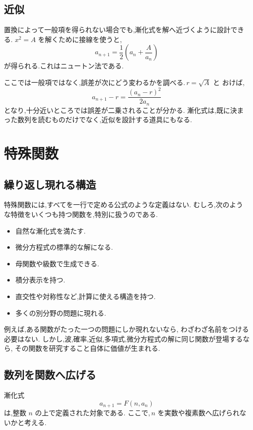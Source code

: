 \subsection{近似}

置換によって一般項を得られない場合でも,漸化式を解へ近づくように設計できる.
$x^2=A$ を解くために接線を使うと,
\[
  a_{n+1}=\frac12\left(a_n+\frac{A}{a_n}\right)
  \tag{A.3}
\]
が得られる.これはニュートン法である.

ここでは一般項ではなく,誤差が次にどう変わるかを調べる.\,$r=\sqrt A$ と
おけば,
\[
  a_{n+1}-r=\frac{(a_n-r)^2}{2a_n}
\]
となり,十分近いところでは誤差が二乗されることが分かる.
漸化式は,既に決まった数列を読むものだけでなく,近似を設計する道具にもなる.

\section{特殊関数}

\subsection{繰り返し現れる構造}

特殊関数には,すべてを一行で定める公式のような定義はない.
むしろ,次のような特徴をいくつも持つ関数を,特別に扱うのである.

\begin{itemize}
  \item 自然な漸化式を満たす.
  \item 微分方程式の標準的な解になる.
  \item 母関数や級数で生成できる.
  \item 積分表示を持つ.
  \item 直交性や対称性など,計算に使える構造を持つ.
  \item 多くの別分野の問題に現れる.
\end{itemize}

例えば,ある関数がたった一つの問題にしか現れないなら,
わざわざ名前をつける必要はない.
しかし,波,確率,近似,多項式,微分方程式の解に同じ関数が登場するなら,
その関数を研究すること自体に価値が生まれる.

\subsection{数列を関数へ広げる}

漸化式
\[
  a_{n+1}=F(n,a_n)
\]
は,整数 $n$ の上で定義された対象である.
ここで,\,$n$ を実数や複素数へ広げられないかと考える.

